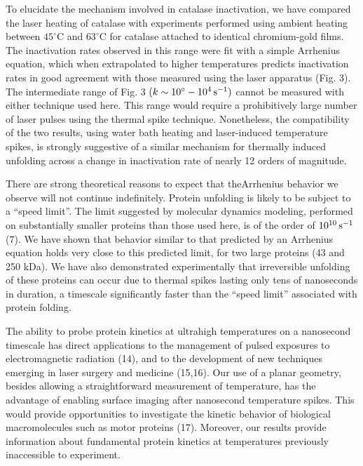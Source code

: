 \documentclass{biophys_letter}
\begin{document}
To elucidate the mechanism involved in catalase inactivation, we have compared the laser heating of catalase with experiments performed using ambient heating between $45^\circ$C and $63^\circ$C for catalase attached to identical chromium-gold films. The inactivation rates observed in this range were fit with a simple Arrhenius equation, which when extrapolated to higher temperatures predicts inactivation rates in good agreement with those measured using the laser apparatus (Fig. 3). The intermediate range of Fig. 3 $(k \sim 10^\circ - 10^4\, {\rm s}^{-1})$ cannot be measured with either technique used here. This range would require a prohibitively large number of laser pulses using the thermal spike technique. Nonetheless, the compatibility of the two results, using water bath heating and laser-induced temperature spikes, is strongly suggestive of a similar mechanism for thermally induced unfolding across a change in inactivation rate of nearly 12 orders of magnitude.

There are strong theoretical reasons to expect that the\break Arrhenius behavior we observe will not continue indefinitely. Protein unfolding is likely to be subject to a ``speed limit''. The limit suggested by molecular dynamics modeling, performed on substantially smaller proteins than those used here, is of the order of $10^{10}\,{\rm s}^{-1}$ (7). We have shown that behavior similar to that predicted by an Arrhenius equation holds very close to this predicted limit, for two large proteins (43 and 250 kDa). We have also demonstrated experimentally that irreversible unfolding of these proteins can occur due to thermal spikes lasting only tens of nanoseconds in duration, a timescale significantly faster than the ``speed limit'' associated with protein folding.

The ability to probe protein kinetics at ultrahigh temperatures on a nanosecond timescale has direct applications to the management of pulsed exposures to electromagnetic radiation (14), and to the development of new techniques emerging in laser surgery and medicine (15,16). Our use of a planar geometry, besides allowing a straightforward measurement of temperature, has the advantage of enabling surface imaging after nanosecond temperature spikes. This would provide opportunities to investigate the kinetic behavior of biological macromolecules such as motor proteins (17). Moreover, our results provide information about fundamental protein kinetics at temperatures previously inaccessible to experiment.\vspace*{4pc}
\end{document}
